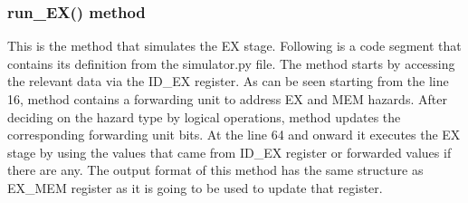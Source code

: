 \subsubsection{run\_EX() method}
This is the method that simulates the EX stage. Following is a code segment that contains its definition from the simulator.py file. The method starts by accessing the relevant data via the ID\_EX register. As can be seen starting from the line 16, method contains a forwarding unit to address EX and MEM hazards. After deciding on the hazard type by logical operations, method updates the corresponding forwarding unit bits. At the line 64 and onward it executes the EX stage by using the values that came from ID\_EX register or forwarded values if there are any. The output format of this method has the same structure as EX\_MEM register as it is going to be used to update that register.
\vspace{0.5 cm}
